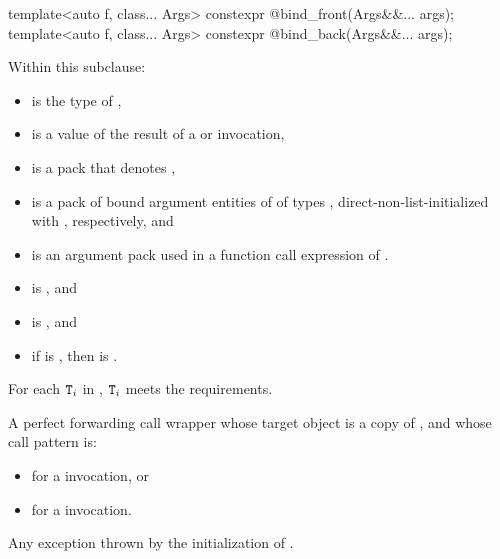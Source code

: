 %
%
\begin{itemdecl}
template<auto f, class... Args>
  constexpr @\unspec@ bind_front(Args&&... args);
template<auto f, class... Args>
  constexpr @\unspec@ bind_back(Args&&... args);
\end{itemdecl}

\begin{itemdescr}
\pnum
Within this subclause:
\begin{itemize}
\item
{} is the type of ,
\item
{} is a value of the result of
a  or  invocation,
\item
{} is a pack that denotes ,
\item
{} is a pack of bound argument entities of
 of types ,
direct-non-list-initialized with ,
respectively, and
\item
{} is an argument pack used in
a function call expression of .
\end{itemize}

\pnum
\mandates
\begin{itemize}
\item
{} is , and
\item
{} is , and
\item
if  is ,
then  is .
\end{itemize}

\pnum
\expects
For each $\tcode{T}_i$ in ,
$\tcode{T}_i$ meets the  requirements.

\pnum
\returns
A perfect forwarding call wrapper 
whose target object is a copy of , and
whose call pattern is:
\begin{itemize}
\item
{}
for a  invocation, or
\item
{}
for a  invocation.
\end{itemize}

\pnum
\throws
Any exception thrown by the initialization of .
\end{itemdescr}

